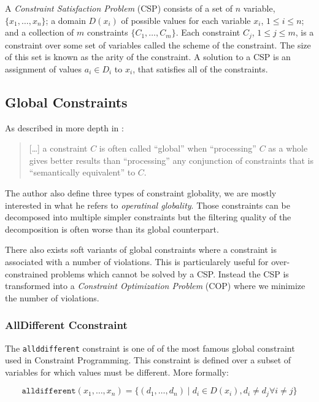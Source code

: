 \documentclass[../../thesis.tex]{subfiles}
\begin{document}
A \emph{Constraint Satisfaction Problem} (CSP) consists of a set of $n$ variable, 
$\{x_1, \dots, x_n \}$; a domain $D(x_i)$ of possible values for each variable $x_i$, 
$1 \leq i \leq n$; and a collection of $m$ constraints $\{ C_1, \dots, C_m \}$. 
Each constraint $C_j$, $1 \leq j \leq m$, is a constraint over some set of variables called the scheme 
of the constraint. The size of this set is known as the arity of the constraint. 
A solution to a CSP is an assignment of values $a_i \in D_i$ to $x_i$, that satisfies all of the constraints. \cite{cp-definition}

\subsection{Global Constraints}

As described in more depth in \cite{Hentenryck:2003}:

\begin{quotation}
  [\dots] a constraint $C$ is often called “global” when “processing” $C$ as a whole gives better results than “processing” any conjunction
  of constraints that is “semantically equivalent” to $C$.
\end{quotation}

The author also define three types of constraint globality, we are mostly interested in what he refers to \emph{operatinal globality}. 
Those constraints can be decomposed into multiple simpler constraints but the filtering quality of the decomposition
is often worse than its global counterpart. 

There also exists soft variants \cite{Regin:2000} of global constraints where a constraint is associated with 
a number of violations. This is particularely useful for over-constrained problems which cannot be solved by a CSP.
Instead the CSP is transformed into a \emph{Constraint Optimization Problem} (COP) where we minimize the number of violations.
\subsubsection{AllDifferent Cconstraint}
\label{sota:alldifferent}

The \texttt{allddifferent} constraint \cite{Rgin1994AFA} is one of of the most famous global constraint used in Constraint 
Programming.
This constraint is defined over a subset of variables for which values must be different. More formally:

\begin{equation*}
  \texttt{alldifferent}(x_1, \dots, x_n) = \{ (d_1, \dots, d_n) \mid d_i \in D(x_i), d_i \neq d_j \forall i \neq j \}
\end{equation*}
\end{document}
